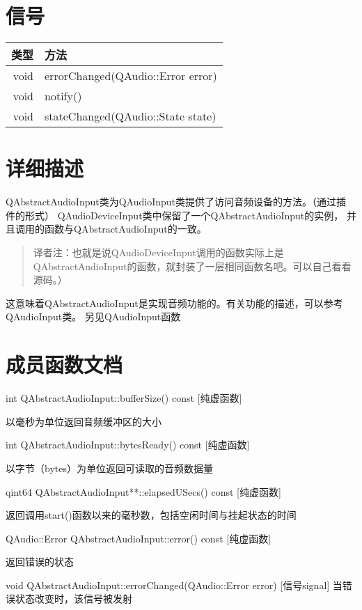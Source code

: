 \section{信号}

\begin{tabular}{|r|l|}
	\hline
	类型 & 方法 \\
	\hline
	void & errorChanged(QAudio::Error error)\\      
	\hline
	void & notify()\\
	\hline
	void & stateChanged(QAudio::State state)\\      
        \hline
\end{tabular}

\section{详细描述}

QAbstractAudioInput类为QAudioInput类提供了访问音频设备的方法。（通过插
件的形式） QAudioDeviceInput类中保留了一个QAbstractAudioInput的实例，
并且调用的函数与QAbstractAudioInput的一致。

\begin{quote}
译者注：也就是说QAudioDeviceInput调用的函数实际上是QAbstractAudioInput的函数，就封装了一层相同函数名吧。可以自己看看源码。）
\end{quote}

这意味着QAbstractAudioInput是实现音频功能的。有关功能的描述，可以参考
QAudioInput类。 另见QAudioInput函数

\section{成员函数文档}

int QAbstractAudioInput::bufferSize() const [纯虚函数]

以毫秒为单位返回音频缓冲区的大小

int QAbstractAudioInput::bytesReady() const [纯虚函数]

以字节（bytes）为单位返回可读取的音频数据量

qint64 QAbstractAudioInput**::elapsedUSecs() const [纯虚函数]

返回调用start()函数以来的毫秒数，包括空闲时间与挂起状态的时间

QAudio::Error QAbstractAudioInput::error() const [纯虚函数]

返回错误的状态

void QAbstractAudioInput::errorChanged(QAudio::Error error) [信号signal]
当错误状态改变时，该信号被发射

